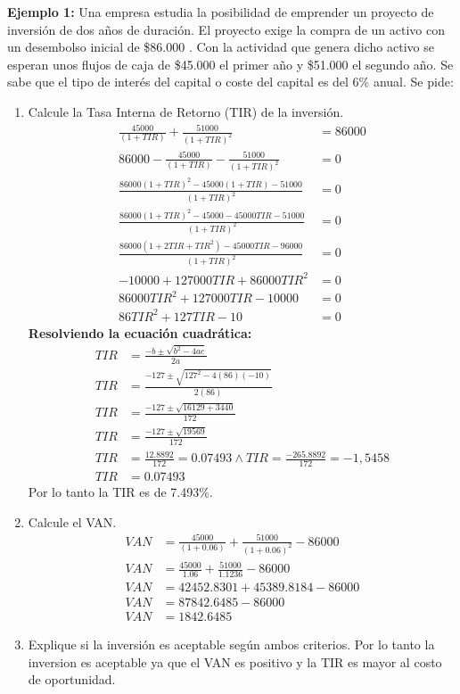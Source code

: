 \documentclass{templateNote}
\begin{document}
\newpage
\textbf{Ejemplo 1:} Una empresa estudia la posibilidad de emprender un proyecto de inversión de dos años de duración. El proyecto exige la compra de un activo con un desembolso inicial de \$86.000 . Con la actividad que genera dicho activo se esperan unos flujos de caja de \$45.000 el primer año y \$51.000 el segundo año. Se sabe que el tipo de interés del capital o coste del capital es del 6\% anual. Se pide:
\begin{enumerate}[label=\alph*)]
    \item Calcule la Tasa Interna de Retorno (TIR) de la inversión.
    \begin{align*}
        \frac{45000}{(1+TIR)} + \frac{51000}{(1+TIR)^2} &= 86000 \\
        86000 - \frac{45000}{(1+TIR)} - \frac{51000}{(1+TIR)^2} &= 0 \\
        \frac{86000(1+TIR)^2 - 45000(1+TIR) - 51000}{(1+TIR)^2} &= 0 \\
        \frac{86000(1+TIR)^2 - 45000 - 45000TIR - 51000}{(1+TIR)^2} &= 0 \\
        \frac{86000(1+2TIR+{TIR}^2)-45000TIR-96000}{(1+TIR)^2} &= 0 \\
        -10000 + 127000TIR + 86000{TIR}^2 &= 0 \\
        86000{TIR}^2 + 127000TIR - 10000 &= 0 \\
        86{TIR}^2 + 127TIR - 10 &= 0 
    \end{align*}
        \textbf{Resolviendo la ecuación cuadrática:}
    \begin{align*}
        TIR &= \frac{-b \pm \sqrt{b^2 - 4ac}}{2a} \\
        TIR &= \frac{-127 \pm \sqrt{127^2 - 4(86)(-10)}}{2(86)} \\
        TIR &= \frac{-127 \pm \sqrt{16129 + 3440}}{172} \\
        TIR &= \frac{-127 \pm \sqrt{19569}}{172} \\
        TIR &= \frac{12.8892}{172} = 0.07493 \wedge TIR = \frac{-265.8892}{172} = -1,5458 \\
        TIR &= 0.07493
    \end{align*}
    Por lo tanto la TIR es de 7.493\%.
    \item Calcule el VAN.
    \begin{align*}
        VAN &= \frac{45000}{(1+0.06)} + \frac{51000}{(1+0.06)^2} - 86000 \\
        VAN &= \frac{45000}{1.06} + \frac{51000}{1.1236} - 86000 \\
        VAN &= 42452.8301 + 45389.8184 - 86000 \\
        VAN &= 87842.6485 - 86000 \\
        VAN &= 1842.6485
    \end{align*}
    \item Explique si la inversión es aceptable según ambos criterios.
    Por lo tanto la inversion es aceptable ya que el VAN es positivo y la TIR es mayor al costo de oportunidad.
\end{enumerate}
\end{document}
